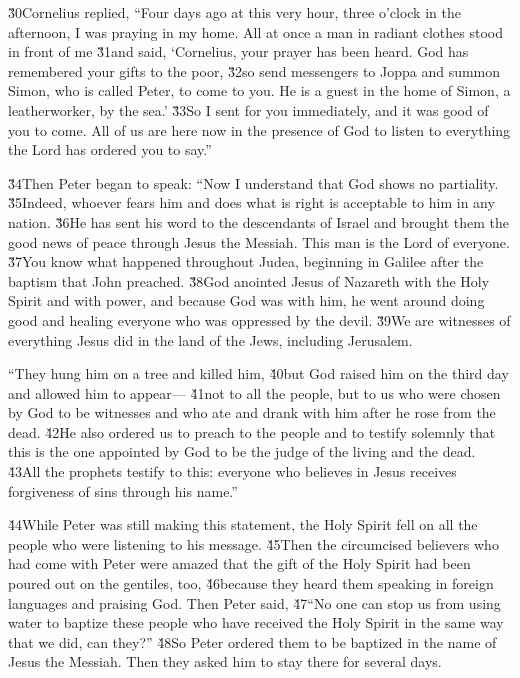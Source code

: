 \v{30}Cornelius replied, ``Four days ago at this very hour, three o'clock in the afternoon, I was praying in my home. All at once a man in radiant clothes stood in front of me \v{31}and said, `Cornelius, your prayer has been heard. God has remembered your gifts to the poor, \v{32}so send messengers to Joppa and summon Simon, who is called Peter, to come to you. He is a guest in the home of Simon, a leatherworker, by the sea.' \v{33}So I sent for you immediately, and it was good of you to come. All of us are here now in the presence of God to listen to everything the Lord has ordered you to say.''

\v{34}Then Peter began to speak: ``Now I understand that God shows no partiality. \v{35}Indeed, whoever fears him and does what is right is acceptable to him in any nation. \v{36}He has sent his word to the descendants of Israel and brought them the good news of peace through Jesus the Messiah. This man is the Lord of everyone. \v{37}You know what happened throughout Judea, beginning in Galilee after the baptism that John preached. \v{38}God anointed Jesus of Nazareth with the Holy Spirit and with power, and because God was with him, he went around doing good and healing everyone who was oppressed by the devil. \v{39}We are witnesses of everything Jesus did in the land of the Jews, including Jerusalem.

``They hung him on a tree and killed him, \v{40}but God raised him on the third day and allowed him to appear--- \v{41}not to all the people, but to us who were chosen by God to be witnesses and who ate and drank with him after he rose from the dead. \v{42}He also ordered us to preach to the people and to testify solemnly that this is the one appointed by God to be the judge of the living and the dead. \v{43}All the prophets testify to this: everyone who believes in Jesus receives forgiveness of sins through his name.''

\v{44}While Peter was still making this statement, the Holy Spirit fell on all the people who were listening to his message. \v{45}Then the circumcised believers who had come with Peter were amazed that the gift of the Holy Spirit had been poured out on the gentiles, too, \v{46}because they heard them speaking in foreign languages and praising God. Then Peter said, \v{47}``No one can stop us from using water to baptize these people who have received the Holy Spirit in the same way that we did, can they?'' \v{48}So Peter ordered them to be baptized in the name of Jesus the Messiah. Then they asked him to stay there for several days.

